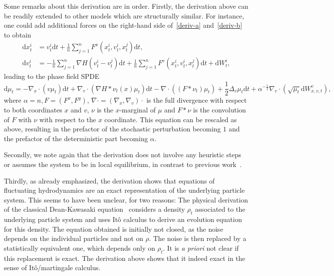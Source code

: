 \documentclass{article}
\newcommand{\dd}{\text{d}}
\begin{document}
Some remarks about this derivation are in order.  Firstly, the derivation above can be readily extended to
other models which are structurally similar. For instance, one could add additional forces on the right-hand
side of~\eqref{deriv-a} and~\eqref{deriv-b} to obtain
\begin{align*}
  \dd x_t^i &= v_t^i\dd t + \frac 1 n \sum_{j=1}^n F^x(x^{i}_t, v^{i}_t,x^j_t)\dd t, \label{ext_deriv-a}\\
  \dd v_t^i &= -\frac 1 n \sum_{j=1}^n \nabla H(v_t^i - v_t^j) \dd t +  \frac 1 n \sum_{j=1}^n F^v(x^{i}_t, v^{i}_t,x^j_t) \dd t +\dd W_t^i, 
\end{align*}
leading to the phase field SPDE
\begin{equation*}\dd \mu_t =  -\nabla_x \cdot (v \mu_t) \dd t +  \nabla_v\cdot ( \nabla H \ast \nu_t(x)\mu_t) \dd t  - \nabla \cdot( (F*\nu_t) \mu_t) + \frac 1 2 \Delta_v \mu_t \dd t
  +\alpha^ {-\frac 1 2 }\nabla_v \cdot\left(\sqrt{\mu_t}\dd W_{x,v,t}^v\right),
\end{equation*}
where $\alpha =n, F=(F^x, F^y)$, $\nabla \cdot = (\nabla_x, \nabla_v)\cdot$ is the full divergence with
respect to both coordinates $x$ and $v$, $\nu$ is the $x$-marginal of $\mu$ and $F*\nu$ is the convolution of
$F$ with $\nu$ with respect to the $x$ coordinate. This equation can be rescaled as above, resulting in the
prefactor of the stochastic perturbation becoming $1$ and the prefactor of the deterministic part becoming
$\alpha$.


Secondly, we note again that the derivation does not involve any heuristic steps or assumes the system to be
in local equilibrium, in contrast to previous
work~\cite{Cornalba2021a,Cornalba2019a,Cornalba2020a,Lutsko2012a}.

Thirdly, as already emphasized, the derivation shows that equations of fluctuating hydrodynamics are an exact
representation of the underlying particle system.  This seems to have been unclear, for two reasons: The
physical derivation of the classical Dean-Kawasaki equation~\cite{Dean1996a} considers a density $\rho_t$
associated to the underlying particle system and uses It\^o calculus to derive an evolution equation for this
density. The equation obtained is initially not closed, as the noise depends on the individual particles and
not on $\rho$. The noise is then replaced by a statistically equivalent one, which depends only on
$\rho_t$. It is \emph{a priori} not clear if this replacement is exact. The derivation above shows that it
indeed exact in the sense of It\^o/martingale calculus.
\end{document}
